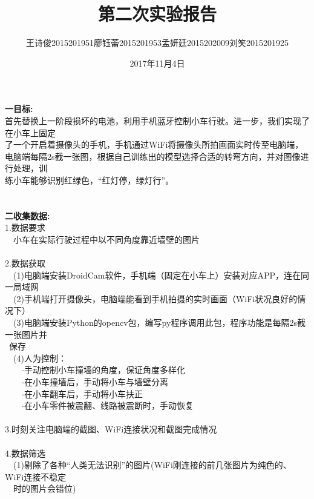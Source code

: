 \documentclass[19pt,a4paper]{article}
\title{第二次实验报告}
\author{王诗俊2015201951\quad 廖钰蕾2015201953\quad  孟妍廷2015202009\quad  刘笑2015201925}
\date{2017年11月4日}
\begin{document}
\maketitle

\textbf{一\quad 目标:}\\
\indent 首先替换上一阶段损坏的电池，利用手机蓝牙控制小车行驶。进一步，我们实现了在小车上固定\\
\indent 了一个开启着摄像头的手机，手机通过WiFi将摄像头所拍画面实时传至电脑端，\\
\indent 电脑端每隔2s截一张图，根据自己训练出的模型选择合适的转弯方向，并对图像进行处理，训\\
\indent 练小车能够识别红绿色，“红灯停，绿灯行”。\\
\\
\\
\indent\textbf{二\quad 收集数据:}\\ 
\indent 1.数据要求\\
\indent\ \ 小车在实际行驶过程中以不同角度靠近墙壁的图片\\
 \\
\indent 2.数据获取\\
\indent\ \ (1)电脑端安装DroidCam软件，手机端（固定在小车上）安装对应APP，连在同一局域网\\
\indent\ \ (2)手机端打开摄像头，电脑端能看到手机拍摄的实时画面（WiFi状况良好的情况下）\\
\indent\ \ (3)电脑端安装Python的opencv包，编写py程序调用此包，程序功能是每隔2s截一张图片并\\
\indent \ 保存\\
\indent\ \ (4)人为控制：\\
\indent\ \ \ \ $\cdot$手动控制小车撞墙的角度，保证角度多样化\\
\indent\ \ \ \ $\cdot$在小车撞墙后，手动将小车与墙壁分离\\
\indent\ \ \ \ $\cdot$在小车翻车后，手动将小车扶正\\
\indent\ \ \ \ $\cdot$在小车零件被震翻、线路被震断时，手动恢复\\
\\
\indent 3.时刻关注电脑端的截图、WiFi连接状况和截图完成情况\\
\\
\indent 4.数据筛选\\
\indent\ \ (1)剔除了各种“人类无法识别”的图片(WiFi刚连接的前几张图片为纯色的、WiFi连接不稳定\\
\indent\ \ 时的图片会错位)\\
\end{document}
